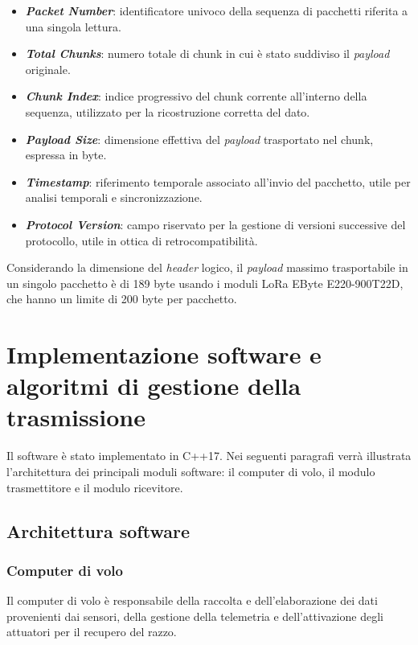\documentclass[12pt,a4paper,twoside]{book}
\begin{document}
\begin{itemize}
    \item \textbf{\emph{Packet Number}}: identificatore univoco della sequenza di pacchetti riferita a una singola lettura.
    \item \textbf{\emph{Total Chunks}}: numero totale di chunk in cui è stato suddiviso il \emph{payload} originale.
    \item \textbf{\emph{Chunk Index}}: indice progressivo del chunk corrente all'interno della sequenza, utilizzato per la ricostruzione corretta del dato.
    \item \textbf{\emph{Payload Size}}: dimensione effettiva del \emph{payload} trasportato nel chunk, espressa in byte.
    \item \textbf{\emph{Timestamp}}: riferimento temporale associato all’invio del pacchetto, utile per analisi temporali e sincronizzazione.
    \item \textbf{\emph{Protocol Version}}: campo riservato per la gestione di versioni successive del protocollo, utile in ottica di retrocompatibilità.
\end{itemize} 

Considerando la dimensione del \emph{header} logico, il \emph{payload} massimo trasportabile in un singolo pacchetto
è di 189 byte usando i moduli \ac{LoRa} EByte E220-900T22D, che hanno un limite di 200 byte per pacchetto.

\section{Implementazione software e algoritmi di gestione della trasmissione}
Il software è stato implementato in C++17. Nei seguenti paragrafi verrà illustrata
l'architettura dei principali moduli software: il computer di volo,
il modulo trasmettitore e il modulo ricevitore.

\subsection{Architettura software}

\subsubsection{Computer di volo}
Il computer di volo è responsabile della raccolta e dell'elaborazione dei dati
provenienti dai sensori, della gestione della telemetria e dell'attivazione degli
attuatori per il recupero del razzo.
\end{document}
